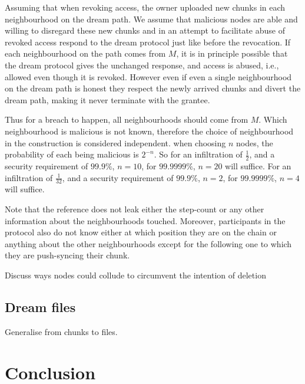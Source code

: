 Assuming that when  revoking access, the owner uploaded new chunks in each neighbourhood on the dream path. We assume that malicious nodes are able and willing to disregard these  new chunks and in an attempt to facilitate abuse of revoked access respond to the dream protocol just like  before the revocation.
If each  neighbourhood  on  the path comes from $M$, it is in principle possible that the dream protocol gives the unchanged response, and access is abused, i.e., allowed even though it is revoked.
However even if even  a single neighbourhood on the dream path is honest they respect the newly arrived chunks and divert the dream path, making it never terminate with the grantee. 

Thus for  a breach to happen, all neighbourhoods should come from $M$.
Which neighbourhood is malicious is not known, therefore the choice of neighbourhood in the construction is considered independent. when choosing $n$ nodes, the probability of each being malicious is $2^{-n}$. So for an infiltration of $\frac{1}{2}$, and a security requirement of $99.9\%$, $n=10$, for $99.9999\%$, $n=20$ will suffice. For an infiltration of $\frac{1}{32}$, and a security requirement of $99.9\%$, $n=2$, for $99.9999\%$, $n=4$ will suffice. 

Note that the reference does not leak either the step-count or any other information about the neighbourhoods touched. Moreover, participants in the protocol also do not know either at which position they are on the chain or anything  about the other neighbourhoods except for the following one to which they are push-syncing their chunk.

Discuss ways nodes could collude to circumvent the intention of deletion


\subsection{Dream files}

Generalise from chunks to files. 

\section{Conclusion}







